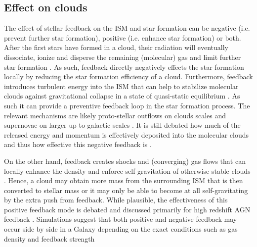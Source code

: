 \subsection{Effect on clouds}
The effect of stellar feedback on the ISM and star formation can be negative (i.e. prevent further star formation), positive (i.e. enhance star formation) or both.
After the first stars have formed in a cloud, their radiation will eventually dissociate, ionize and disperse the remaining (molecular) gas and limit further star formation \citep{2002ApJ...566..302M,2016MNRAS.463.3129G,2018ApJ...853..173K,2018MNRAS.481.2548G}. As such, feedback directly negatively effects the star formation locally by reducing the star formation efficiency of a cloud.
Furthermore, feedback introduces turbulent energy into the ISM that can help to stabilize molecular clouds against gravitational collapse in a state of quasi-static equilibrium \citep{2005ApJ...630..250K,2007ApJ...654..304K,2013ApJ...763...51F}. As such it can provide a preventive feedback loop in the star formation process. The relevant mechanisms are likely proto-stellar outflows on clouds scales \citep[e.g.][]{2010ApJ...709...27W,Krumholz:2012ja,2013A&A...558A..81B} and supernovae on larger up to galactic scales \citep{2016ApJ...822...11P}. It is still debated how much of the released energy and momentum is effectively deposited into the molecular clouds and thus how effective this negative feedback is \citep[e.g.][]{2010ApJ...715.1170A,2015Natur.527...70P,2018ApJ...855...81S}.

On the other hand, feedback creates shocks and (converging) gas flows that can locally enhance the density and enforce self-gravitation of otherwise stable clouds \citep[e.g.][]{1994A&A...290..421W,2012ApJ...744..130K}. Hence, a cloud may obtain more mass from the surrounding ISM that is then converted to stellar mass or it may only be able to become at all self-gravitating by the extra push from feedback. While plausible, the effectiveness of this positive feedback mode is debated \citep[e.g.][]{2015MNRAS.450.1199D,2017MNRAS.464.3536R} and discussed primarily for high redshift AGN feedback \citep[e.g.][]{2015ApJ...799...82C}.
Simulations suggest that both positive and negative feedback may occur side by side in a Galaxy depending on the exact conditions such as gas density and feedback strength \citep[e.g.][]{2017MNRAS.467..512S}


